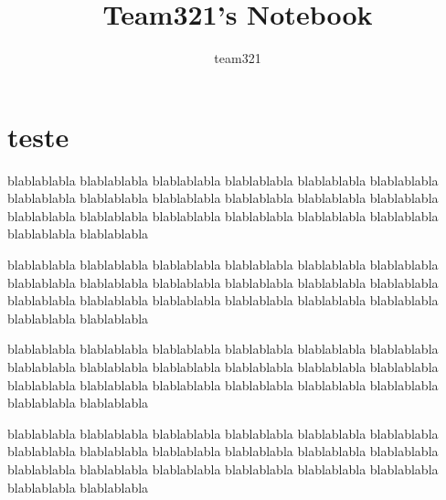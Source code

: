 \documentclass[a4paper, 8pt, twocolumn] {article}
\title{Team321's Notebook}
\author{team321}
\begin{document}
\maketitle

\section{teste} %
\label{sec:teste}

blablablabla blablablabla blablablabla blablablabla blablablabla
blablablabla blablablabla blablablabla blablablabla blablablabla
blablablabla blablablabla blablablabla blablablabla blablablabla
blablablabla blablablabla blablablabla blablablabla blablablabla

blablablabla blablablabla blablablabla blablablabla blablablabla
blablablabla blablablabla blablablabla blablablabla blablablabla
blablablabla blablablabla blablablabla blablablabla blablablabla
blablablabla blablablabla blablablabla blablablabla blablablabla

blablablabla blablablabla blablablabla blablablabla blablablabla
blablablabla blablablabla blablablabla blablablabla blablablabla
blablablabla blablablabla blablablabla blablablabla blablablabla
blablablabla blablablabla blablablabla blablablabla blablablabla

blablablabla blablablabla blablablabla blablablabla blablablabla
blablablabla blablablabla blablablabla blablablabla blablablabla
blablablabla blablablabla blablablabla blablablabla blablablabla
blablablabla blablablabla blablablabla blablablabla blablablabla
\end{document}
